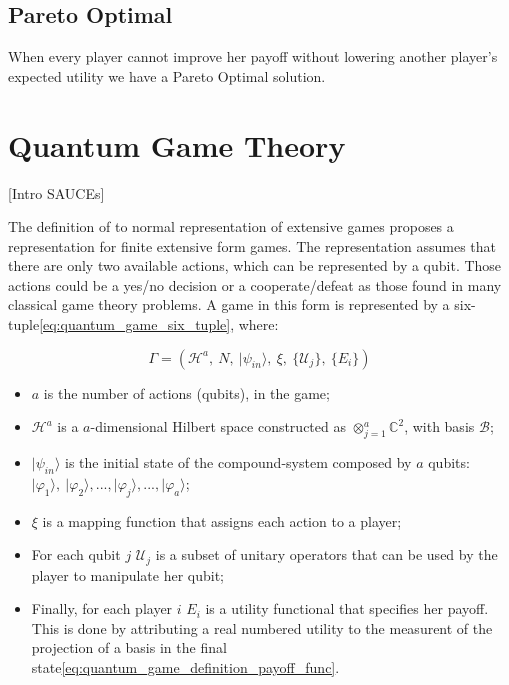 \subsection{Pareto Optimal}
\label{subsec:background:game_theory_pareto_optimal}

When every player cannot improve her payoff without lowering another player's expected utility we have a Pareto Optimal solution.





\section{Quantum Game Theory}
\label{sec:background_quantum_game_theory}

[Intro SAUCEs]

The definition of to normal representation of extensive games proposes a representation
for finite extensive form games\cite{Fra2011}\cite{Fra2011a}. The representation assumes that there
are only two available actions, which can be represented by a qubit.
Those actions could be a yes/no decision or a cooperate/defeat as
those found in many classical game theory problems. A game in this
form is represented by a six-tuple\ref{eq:quantum_game_six_tuple},
where:

\begin{equation}
\Gamma=(\mathcal{H}^{a},\: N,\:\vert\psi_{in}\rangle,\:\xi,\:\{\mathcal{U}_{j}\},\:\{E_{i}\})\label{eq:quantum_game_six_tuple}
\end{equation}

\begin{itemize}
\item $a$ is the number of actions (qubits), in the game; 
\item $\mathcal{H}^{a}$ is a $a$-dimensional Hilbert space constructed
as $\otimes_{j=1}^{a}\mathbb{C}^{2}$, with basis $\mathcal{B}$;
\item $\vert\psi_{in}\rangle$ is the initial state of the compound-system
composed by $a$ qubits: $\vert\varphi_{1}\rangle,\:\vert\varphi_{2}\rangle, ..., \vert\varphi_{j}\rangle, ..., \vert\varphi_{a}\rangle$;
\item $\xi$ is a mapping function that assigns each action to a player;
\item For each qubit $j$ $\mathcal{U}_{j}$ is a subset of unitary operators
that can be used by the player to manipulate her qubit;
\item Finally, for each player $i$ $E_{i}$ is a utility functional that
specifies her payoff. This is done by attributing a real numbered utility to the measurent of the projection of a basis in the final state\ref{eq:quantum_game_definition_payoff_func}.\end{itemize}

